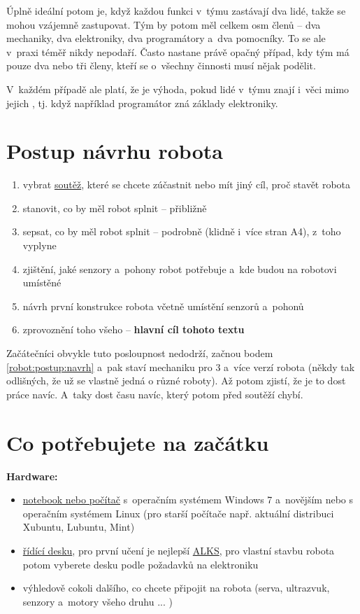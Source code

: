Úplně ideální potom je, když každou funkci v~týmu zastávají dva lidé, takže se mohou vzájemně zastupovat.
Tým by potom měl celkem osm členů -- dva mechaniky, dva elektroniky, dva programátory a~dva pomocníky.
To se ale v~praxi téměř nikdy nepodaří.
Často nastane právě opačný případ, kdy tým má pouze dva nebo tři členy, kteří se o~všechny činnosti musí nějak podělit.

V~každém případě ale platí, že je výhoda, pokud lidé v~týmu znají i~věci mimo jejich , tj. když například programátor zná základy elektroniky.

\section{Postup návrhu robota}

\begin{enumerate} %
\item  vybrat \hyperref[prehled_soutezi]{soutěž}, které se chcete zúčastnit nebo mít jiný cíl, proč stavět robota 
\item  stanovit, co by měl robot splnit -- přibližně 
\item  sepsat, co by měl robot splnit -- podrobně (klidně i~více stran A4), z~toho vyplyne
\item  zjištění, jaké senzory a~pohony robot potřebuje a~kde budou na robotovi umístěné
\item  návrh první konstrukce robota včetně umístění senzorů a~pohonů \label{robot:postup:navrh}
\item  zprovoznění toho všeho -- {\bf hlavní cíl tohoto textu }
\end{enumerate}


Začátečníci obvykle tuto posloupnost nedodrží, začnou bodem \ref{robot:postup:navrh} a~pak staví mechaniku pro 
3 a~více verzí robota (někdy tak odlišných, že už se vlastně jedná o různé roboty). Až potom zjistí, že je to dost práce navíc.
A~taky dost času navíc, který potom před soutěží chybí. 

\section{Co potřebujete na začátku}

{\bf Hardware: }

\begin{itemize} 
\item  \hyperref[pocitac]{notebook nebo počítač} s~operačním systémem Windows 7 a~novějším nebo s operačním systémem Linux (pro starší počítače např. aktuální distribuci Xubuntu, Lubuntu, Mint)
\item \hyperref[ridici_desky]{řídící desku}, pro první učení je nejlepší \hyperref[alks]{ALKS}, pro vlastní stavbu robota potom vyberete desku podle požadavků na elektroniku  
\item výhledově cokoli dalšího, co chcete připojit na robota (serva, ultrazvuk, senzory a~motory všeho druhu ... )
\end{itemize}



